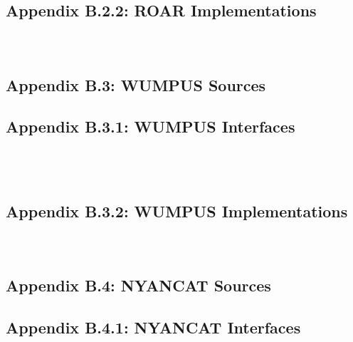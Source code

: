 \documentclass{article}[11pt]
\begin{document}
\subsection{Appendix B.2.2: ROAR Implementations}
\inputminted[frame=single,label=InterfaceResource.groovy]{python}{../naomi/src/main/groovy/org/radigan/naomi/roar/impl/InterfaceResource.groovy}
\inputminted[frame=single,label=RoarImpl.groovy]{python}{../naomi/src/main/groovy/org/radigan/naomi/roar/impl/RoarImpl.groovy}
\inputminted[frame=single,label=RoarServlet.groovy]{python}{../naomi/src/main/groovy/org/radigan/naomi/roar/impl/RoarServlet.groovy}
\subsection{Appendix B.3: WUMPUS Sources}
\subsection{Appendix B.3.1: WUMPUS Interfaces}
\inputminted[frame=single,label=Wumpus.java]{java}{../naomi/src/main/java/org/radigan/naomi/wumpus/service/Wumpus.java}
\inputminted[frame=single,label=Functor.java]{java}{../naomi/src/main/java/org/radigan/naomi/wumpus/service/Functor.java}
\inputminted[frame=single,label=AbstractFunctor.groovy]{python}{../naomi/src/main/groovy/org/radigan/naomi/wumpus/service/AbstractFunctor.groovy}
\inputminted[frame=single,label=FunctorList.groovy]{python}{../naomi/src/main/groovy/org/radigan/naomi/wumpus/service/FunctorList.groovy}
\subsection{Appendix B.3.2: WUMPUS Implementations}
\inputminted[frame=single,label=SimulationFunctor.groovy]{python}{../naomi/src/main/groovy/org/radigan/naomi/wumpus/impl/SimulationFunctor.groovy}
\inputminted[frame=single,label=WumpusImpl.groovy]{python}{../naomi/src/main/groovy/org/radigan/naomi/wumpus/impl/WumpusImpl.groovy}
\inputminted[frame=single,label=WumpusUtil.groovy]{python}{../naomi/src/main/groovy/org/radigan/naomi/wumpus/utilities/WumpusUtil.groovy}
\subsection{Appendix B.4: NYANCAT Sources}
\subsection{Appendix B.4.1: NYANCAT Interfaces}
\inputminted[frame=single,label=Report.java]{java}{../naomi/src/main/java/org/radigan/naomi/nyancat/service/Report.java}
\inputminted[frame=single,label=AbstractReport.groovy]{python}{../naomi/src/main/groovy/org/radigan/naomi/nyancat/service/AbstractReport.groovy}
\end{document}
